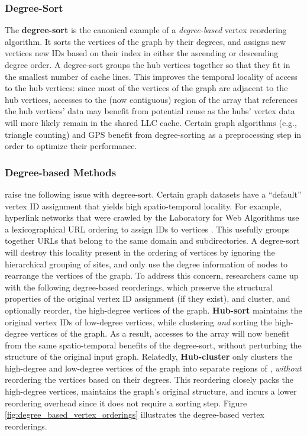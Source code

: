 \subsubsection{Degree-Sort}
The \textbf{degree-sort} is the canonical example of a \textit{degree-based} vertex reordering algorithm. 
It sorts the vertices of the graph by their degrees, and assigns new vertices new IDs based on their index in either the ascending or descending degree order. A degree-sort groups the hub vertices together so that they fit in the smallest number of cache lines. This improves the temporal locality of access to the hub vertices: since most of the vertices of the graph are adjacent to the hub vertices, accesses to the (now contiguous) region of the \vdata{} array that references the hub vertices' data may benefit from potential reuse as the hubs' vertex data will more likely remain in the shared LLC cache. Certain graph algorithms (e.g., triangle counting) \cite{donato2018triangle, koohi2022lotus} and \ac{GPS} \cite{graptor, powerlyra} benefit from degree-sorting as a preprocessing step in order to optimize their performance. 


\subsubsection{Degree-based Methods}
\citet{dbg} raise tne following issue with degree-sort. Certain graph datasets have a ``default'' vertex ID assignment that yields high spatio-temporal locality. For example, hyperlink networks that were crawled by the Laboratory for Web Algorithms use a lexicographical URL ordering to assign IDs to vertices \cite{lwa}. This usefully groups together URLs that belong to the same domain and subdirectories. A degree-sort will destroy this locality present in the ordering of vertices by ignoring the hierarchical grouping of sites, and only use the degree information of nodes to rearrange the vertices of the graph. 
To address this concern, researchers came up with the following degree-based reorderings, which preserve the structural properties of the original vertex ID assignment (if they exist), and cluster, and optionally reorder,  the high-degree vertices of the graph. 
\textbf{Hub-sort} \cite{zhang2016optimizing} maintains the original vertex IDs of low-degree vertices, while clustering \textit{and} sorting the high-degree vertices of the graph. As a result, accesses to the \vdata{} array will now benefit from the same spatio-temporal benefits of the degree-sort, without perturbing the structure of the original input graph.
Relatedly, \textbf{Hub-cluster} \cite{lwr} only clusters the high-degree and low-degree vertices of the graph into separate regions of \vdata{}, \textit{without} reordering the vertices based on their degrees. This reordering closely packs the high-degree vertices, maintains the graph's original structure, and incurs a lower reordering overhead since it does not require a sorting step.
Figure \ref{fig:degree_based_vertex_orderings} illustrates the degree-based vertex reorderings.

